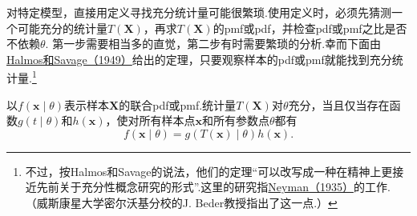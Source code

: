 对特定模型，直接用定义寻找充分统计量可能很繁琐.使用定义时，必须先猜测一个可能充分的统计量$T(\boldsymbol X)$，再求$T(\boldsymbol X)$的pmf或pdf，并检查pdf或pmf之比是否不依赖$\theta$.
第一步需要相当多的直觉，第二步有时需要繁琐的分析.幸而下面由\hyperref[bib:source155]{Halmos和Savage（1949）}给出的定理，只要观察样本的pdf或pmf就能找到充分统计量.\footnote{不过，按Halmos和Savage的说法，他们的定理“可以改写成一种在精神上更接近先前关于充分性概念研究的形式”.这里的研究指\hyperref[bib:source233]{Neyman（1935）}的工作.（威斯康星大学密尔沃基分校的J. Beder教授指出了这一点.）}
\begin{theorem}[因子分解定理]\label{thm:6.2.6}
以$f(\boldsymbol x\mid\theta)$表示样本$\boldsymbol X$的联合pdf或pmf.统计量$T(\boldsymbol X)$对$\theta$充分，当且仅当存在函数$g(t\mid\theta)$和$h(\boldsymbol x)$，使对所有样本点$\boldsymbol x$和所有参数点$\theta$都有
\begin{equation}\label{eq:6.2.3}
f(\boldsymbol x\mid\theta)=g(T(\boldsymbol x)\mid\theta)h(\boldsymbol x).
\end{equation}
\end{theorem}
